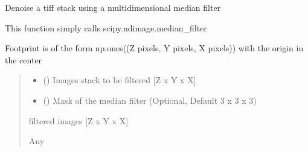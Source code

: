 \documentclass[letterpaper,10pt,english]{sphinxmanual}
\begin{document}
\begin{fulllineitems}
\label{\detokenize{ImageProcessing:ImageProcessing.filter_images}}
\pysigstartsignatures
{}
\pysigstopsignatures
\sphinxAtStartPar
Denoise a tiff stack using a multidimensional median filter

\sphinxAtStartPar
This function simply calls scipy.ndimage.median\_filter

\sphinxAtStartPar
Footprint is of the form np.ones((Z pixels, Y pixels, X pixels)) with the origin in the center
\begin{quote}\begin{description}
\begin{itemize}
\item {} 
\sphinxAtStartPar
{} () \textendash{} Images stack to be filtered {[}Z x Y x X{]}

\item {} 
\sphinxAtStartPar
{} () \textendash{} Mask of the median filter (Optional, Default 3 x 3 x 3)

\end{itemize}

\sphinxAtStartPar
filtered images {[}Z x Y x X{]}

\sphinxAtStartPar
Any

\end{description}\end{quote}

\end{fulllineitems}

\end{document}
